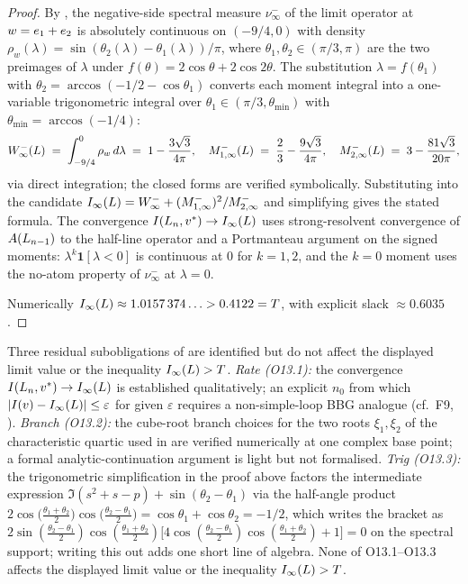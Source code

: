 \begin{proof}
By , the negative-side spectral measure
$\nu^{-}_{\infty}$ of the limit operator at $\earw = e_{1} + e_{2}$ is
absolutely continuous on $(-9/4, 0)$ with density
$\rho_{w}(\lambda) = \sin(\theta_{2}(\lambda) - \theta_{1}(\lambda))/\pi$,
where $\theta_{1}, \theta_{2} \in (\pi/3, \pi)$ are the two preimages
of $\lambda$ under $f(\theta) = 2\cos\theta + 2\cos 2\theta$. The
substitution $\lambda = f(\theta_{1})$ with
$\theta_{2} = \arccos(-1/2 - \cos\theta_{1})$ converts each moment
integral into a one-variable trigonometric integral over
$\theta_{1} \in (\pi/3, \theta_{\min})$ with $\theta_{\min} = \arccos(-1/4)$:
\[
\Wm_{\infty}(L) \;=\; \int_{-9/4}^{0} \rho_{w}\, d\lambda
\;=\; 1 - \frac{3\sqrt{3}}{4\pi},
\quad
\Monem[1,\infty](L) \;=\; \frac{2}{3} - \frac{9\sqrt{3}}{4\pi},
\quad
\Mtwom[2,\infty](L) \;=\; 3 - \frac{81\sqrt{3}}{20\pi},
\]
via direct integration; the closed forms are verified symbolically.
Substituting into the candidate
$\Iinf{L} = \Wm_{\infty} + (\Monem[1,\infty])^{2}/\Mtwom[2,\infty]$ and
simplifying gives the stated formula. The convergence
$I(\Ln, \maxdeg) \to \Iinf{L}$ uses strong-resolvent convergence of
$\Adj(L_{n-1})$ to the half-line operator and a Portmanteau argument on
the signed moments: $\lambda^{k} \mathbf{1}[\lambda < 0]$ is continuous
at $0$ for $k = 1, 2$, and the $k = 0$ moment uses the no-atom property
of $\nu^{-}_{\infty}$ at $\lambda = 0$.

Numerically $\Iinf{L} \approx 1.0157\,374\ldots > 0.4122 = \threshold$,
with explicit slack $\approx 0.6035$.
\end{proof}

\begin{remark}
\label{rem:stieltjes-residuals}
Three residual subobligations of  are
identified but do not affect the displayed limit value or the
inequality $\Iinf{L} > \threshold$. \emph{Rate (O13.1):} the
convergence $I(\Ln, \maxdeg) \to \Iinf{L}$ is established
qualitatively; an explicit $n_{0}$ from which $|\Iv - \Iinf{L}| \le \varepsilon$
for given $\varepsilon$ requires a non-simple-loop BBG analogue (cf.\
F9, ). \emph{Branch (O13.2):} the cube-root
branch choices for the two roots $\xi_{1}, \xi_{2}$ of the
characteristic quartic used in  are verified
numerically at one complex base point; a formal analytic-continuation
argument is light but not formalised. \emph{Trig (O13.3):} the
trigonometric simplification in the proof above factors the
intermediate expression $\Im(s^{2} + s - p) + \sin(\theta_{2} -
\theta_{1})$ via the half-angle product
$2\cos\bigl(\tfrac{\theta_{1}+\theta_{2}}{2}\bigr)
 \cos\bigl(\tfrac{\theta_{2}-\theta_{1}}{2}\bigr)
 = \cos\theta_{1} + \cos\theta_{2} = -1/2$, which writes the bracket as
$2\sin(\tfrac{\theta_{2}-\theta_{1}}{2})\cos(\tfrac{\theta_{1}+\theta_{2}}{2})
\bigl[4\cos(\tfrac{\theta_{2}-\theta_{1}}{2})\cos(\tfrac{\theta_{1}+\theta_{2}}{2})
+ 1\bigr] = 0$ on the spectral support; writing this out adds one
short line of algebra. None of O13.1--O13.3 affects
the displayed limit value or the inequality
$\Iinf{L} > \threshold$.
\end{remark}

